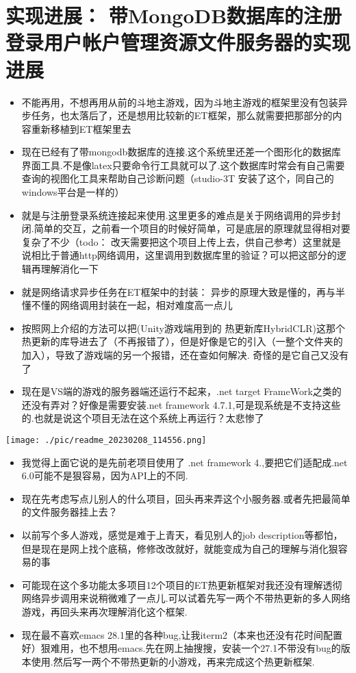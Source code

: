 \documentclass[9pt, b5paper]{article}
\begin{document}
\section{实现进展： 带MongoDB数据库的注册登录用户帐户管理资源文件服务器的实现进展}
\label{sec-6}
\begin{itemize}
\item 不能再用，不想再用从前的斗地主游戏，因为斗地主游戏的框架里没有包装异步任务，也太落后了，还是想用比较新的ET框架，那么就需要把那部分的内容重新移植到ET框架里去
\item 现在已经有了带mongodb数据库的连接.这个系统里还差一个图形化的数据库界面工具.不是像latex只要命令行工具就可以了.这个数据库时常会有自己需要查询的视图化工具来帮助自己诊断问题（studio-3T 安装了这个，同自己的windows平台是一样的）
\item 就是与注册登录系统连接起来使用.这里更多的难点是关于网络调用的异步封闭.简单的交互，之前看一个项目的时候好简单，可是底层的原理就显得相对要复杂了不少（todo： 改天需要把这个项目上传上去，供自己参考）这里就是说相比于普通http网络调用，这里调用到数据库里的验证？可以把这部分的逻辑再理解消化一下
\item 就是网络请求异步任务在ET框架中的封装： 异步的原理大致是懂的，再与半懂不懂的网络调用封装在一起，相对难度高一点儿
\item 按照网上介绍的方法可以把(Unity游戏端用到的 热更新库HybridCLR)这那个热更新的库导进去了（不再报错了），但是好像是它的引入（一整个文件夹的加入），导致了游戏端的另一个报错，还在查如何解决. 奇怪的是它自己又没有了
\item 现在是VS端的游戏的服务器端还运行不起来，.net target FrameWork之类的还没有弄对？好像是需要安装.net framework 4.7.1,可是现系统是不支持这些的.也就是说这个项目无法在这个系统上再运行？太悲惨了
\end{itemize}

\texttt{[image: ./pic/readme\_20230208\_114556.png]}
\begin{itemize}
\item 我觉得上面它说的是先前老项目使用了 .net framework 4.,要把它们适配成.net 6.0可能不是狠容易，因为API上的不同.
\item 现在先考虑写点儿别人的什么项目，回头再来弄这个小服务器.或者先把最简单的文件服务器挂上去？
\item 以前写个多人游戏，感觉是难于上青天，看见别人的job description等都怕，但是现在是网上找个底稿，修修改改就好，就能变成为自己的理解与消化狠容易的事
\item 可能现在这个多功能太多项目12个项目的ET热更新框架对我还没有理解透彻网络异步调用来说稍微难了一点儿.可以试着先写一两个不带热更新的多人网络游戏，再回头来再次理解消化这个框架.
\item 现在最不喜欢emacs 28.1里的各种bug,让我iterm2（本来也还没有花时间配置好）狠难用，也不想用emacs.先在网上抽搜搜，安装一个27.1不带没有bug的版本使用.然后写一两个不带热更新的小游戏，再来完成这个热更新框架.
\end{itemize}
\end{document}
